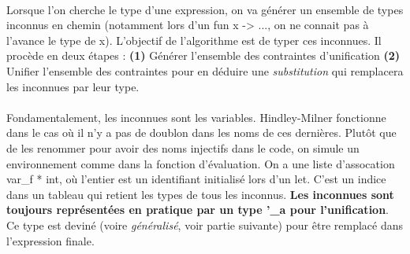 \documentclass{article}
\newcommand\code[1]{{\fontfamily{lmtt}\selectfont #1}}
\begin{document}
	\paragraph{} Lorsque l'on cherche le type d'une expression, on va générer un ensemble de types inconnus en chemin (notamment lors d'un \code{fun x -> ...}, on ne connait pas à l'avance le type de \code{x}). L'objectif de l'algorithme est de typer ces inconnues. Il procède en deux étapes : \textbf{(1)} Générer l'ensemble des contraintes d'unification \textbf{(2)} Unifier l'ensemble des contraintes pour en déduire une \emph{substitution} qui remplacera les inconnues par leur type. 
	
	\paragraph{} Fondamentalement, les inconnues sont les variables. Hindley-Milner fonctionne dans le cas où il n'y a pas de doublon dans les noms de ces dernières. Plutôt que de les renommer pour avoir des noms injectifs dans le code, on simule un environnement comme dans la fonction d'évaluation. On a une liste d'assocation \code{var\_f * int}, où l'entier est un identifiant initialisé lors d'un \code{let}. C'est un indice dans un tableau qui retient les types de tous les inconnus. \textbf{Les inconnues sont toujours représentées en pratique par un type \code{'\_a} pour l'unification}. Ce type est deviné (voire \emph{généralisé}, voir partie suivante) pour être remplacé dans l'expression finale.
	
\end{document}
